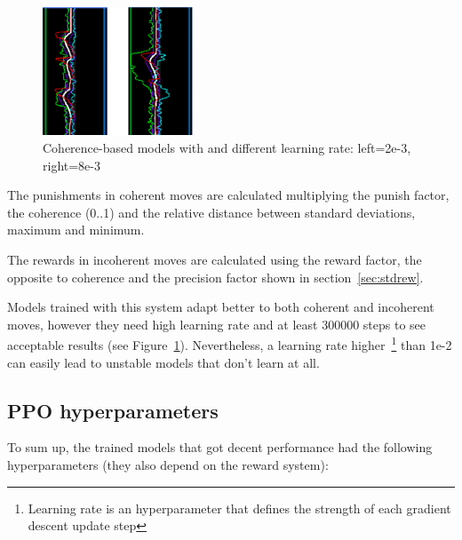 \begin{figure}
    \centering
    \includegraphics[width=0.4\textwidth]{img/graphsCoherence.png}
		\caption{Coherence-based models with and different learning rate: left=2e-3, right=8e-3}
		\label{fig:precisionR}
\end{figure}

The punishments in coherent moves are calculated multiplying the punish factor, the coherence (0..1) and the relative distance between standard deviations, maximum and minimum.

The rewards in incoherent moves are calculated using the reward factor, the opposite to coherence and the precision factor shown in section~\ref{sec:stdrew}.

Models trained with this system adapt better to both coherent and incoherent moves, however they need high learning rate and at least 300000 steps to see acceptable results (see Figure~\ref{fig:precisionR}). Nevertheless, a learning rate higher~\footnote{Learning rate is an hyperparameter that defines the strength of each gradient descent update step} than 1e-2 can easily lead to unstable models that don't learn at all.

\subsection{PPO hyperparameters}

To sum up, the trained models that got decent performance had the following hyperparameters (they also depend on the reward system):

